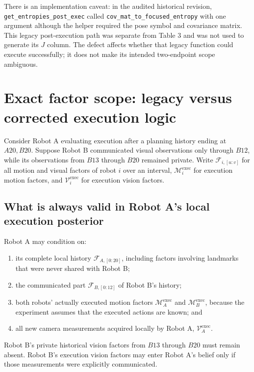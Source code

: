 \documentclass[11pt,a4paper]{article}
\begin{document}
There is an implementation caveat: in the audited historical revision,
\texttt{get\_entropies\_post\_exec} called
\texttt{cov\_mat\_to\_focused\_entropy} with one argument although the helper
required the pose symbol and covariance matrix.  This legacy post-execution
path was separate from Table 3 and was not used to generate its $J$ column.
The defect affects whether that legacy function could execute successfully;
it does not make its intended two-endpoint scope ambiguous.

\section{Exact factor scope: legacy versus corrected execution logic}

Consider Robot A evaluating execution after a planning history ending at
$A20,B20$.  Suppose Robot B communicated visual observations only through
$B12$, while its observations from $B13$ through $B20$ remained private.
Write $\mathcal F_{i,[u:v]}$ for all motion and visual factors of robot $i$
over an interval, $\mathcal M_i^{\mathrm{exec}}$ for execution motion factors,
and $\mathcal V_i^{\mathrm{exec}}$ for execution vision factors.

\subsection{What is always valid in Robot A's local execution posterior}

Robot A may condition on:
\begin{enumerate}
  \item its complete local history $\mathcal F_{A,[0:20]}$, including factors
        involving landmarks that were never shared with Robot B;
  \item the communicated part $\mathcal F_{B,[0:12]}$ of Robot B's history;
  \item both robots' actually executed motion factors
        $\mathcal M_A^{\mathrm{exec}}$ and
        $\mathcal M_B^{\mathrm{exec}}$, because the experiment assumes that
        the executed actions are known; and
  \item all new camera measurements acquired locally by Robot A,
        $\mathcal V_A^{\mathrm{exec}}$.
\end{enumerate}
Robot B's private historical vision factors from $B13$ through $B20$ must
remain absent.  Robot B's execution vision factors may enter Robot A's belief
only if those measurements were explicitly communicated.
\end{document}

